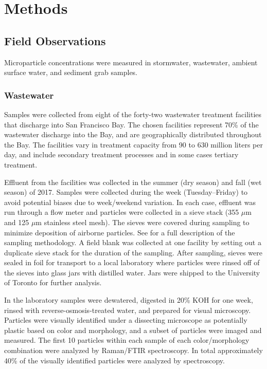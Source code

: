 \documentclass[draft]{jgr/agujournal2019}
\begin{document}

\section{Methods}

\subsection{Field Observations}

Microparticle concentrations were measured in stormwater, wastewater,
ambient surface water, and sediment grab samples.

\subsubsection{Wastewater}

Samples were collected from eight of the forty-two wastewater
treatment facilities that discharge into San Francisco Bay. The chosen
facilities represent 70\% of the wastewater discharge into the Bay,
and are geographically distributed throughout the Bay.
The facilities vary in treatment capacity from 90 to 630 million liters per day,
and include secondary treatment processes and in some cases tertiary
treatment.

Effluent from the facilities was collected in the summer (dry season)
and fall (wet season) of 2017. Samples were collected during the week
(Tuesday--Friday) to avoid potential biases due to week/weekend
variation.  In each case, effluent was run through a flow meter and
particles were collected in a sieve stack (355 $\mu\textrm{m}$ and 125
$\mu\textrm{m}$ stainless steel mesh). The sieves were covered during
sampling to minimize deposition of airborne particles. See
 for a full description of the sampling
methodology.  A field blank was collected at one facility by setting
out a duplicate sieve stack for the duration of the sampling.  After
sampling, sieves were sealed in foil for transport to a local
laboratory where particles were rinsed off of the sieves into glass
jars with distilled water. Jars were shipped to the University of
Toronto for further analysis.

In the laboratory samples were dewatered, digested in 20\% KOH for one
week, rinsed with reverse-osmosis-treated water, and prepared for
visual microscopy. Particles were visually identified under a
dissecting microscope as potentially plastic based on color and
morphology, and a subset of particles were imaged and measured.  The
first 10 particles within each sample of each color/morphology
combination were analyzed by Raman/FTIR spectroscopy. In total
approximately 40\% of the visually identified particles were analyzed
by spectroscopy.
\end{document}
